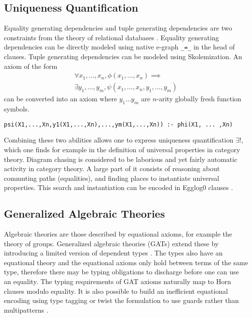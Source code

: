 \documentclass[sigplan,10pt,review]{acmart} %
\begin{document}
\subsection{Uniqueness Quantification}
Equality generating dependencies and tuple generating dependencies are two constraints from the theory of relational databases \cite{databases}.
Equality generating dependencies can be directly modeled using native e-graph \lstinline{_=_} in the head of clauses.
Tuple generating dependencies can be modeled using Skolemization.
An axiom of the form \begin{equation}
\begin{split}
\forall x_1, \ldots, x_n, \phi(x_1, \ldots , x_n) \implies \\
 \exists y_1, \ldots, y_m,  \psi(x_1,\ldots,x_n, y_1,\ldots, y_m) 
\end{split} \end{equation}
can be converted into an axiom where $y_1 \ldots y_m$ are $n$-arity globally fresh function symbols.

\begin{lstlisting}
psi(X1,...,Xn,y1(X1,...,Xn),...,ym(X1,...,Xn)) :- phi(X1, ... ,Xn)
\end{lstlisting}

Combining these two abilities allows one to express uniqueness quantification $\exists!$, which one finds for example in the definition of universal properties in category theory. Diagram chasing is considered to be laborious and yet fairly automatic activity in category theory. A large part of it consists of reasoning about commuting paths (equalities), and finding places to instantiate universal properties\cite{catnapp}. This search and instantiation can be encoded in Egglog0 clauses \cite{pullback, pullback2}.

\subsection{Generalized Algebraic Theories}
Algebraic theories are those described by equational axioms, for example the theory of groups. Generalized algebraic theories (GATs) extend these by introducing a limited version of dependent types \cite{catlab, cartmell}. The types also have an equational theory and the equational axioms only hold between terms of the same type, therefore there may be typing obligations to discharge before one can use an equality.
The typing requirements of GAT axioms naturally map to Horn clauses modulo equality. It is also possible to build an inefficient equational encoding using type tagging\cite{typetag} or twist the formulation to use guards rather than multipatterns \cite{monoidal}.
\end{document}
